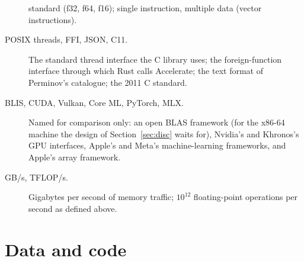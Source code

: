 \documentclass[11pt]{article}
\begin{document}
\begin{description}
  standard (f32, f64, f16); single instruction, multiple data (vector
  instructions).
\item[POSIX threads, FFI, JSON, C11.]  The standard thread interface the C
  library uses; the foreign-function interface through which Rust calls
  Accelerate; the text format of Perminov's catalogue; the 2011 C standard.
\item[BLIS, CUDA, Vulkan, Core ML, PyTorch, MLX.]  Named for comparison only:
  an open BLAS framework (for the x86-64 machine the design of
  Section~\ref{sec:disc} waits for), Nvidia's and Khronos's GPU interfaces,
  Apple's and Meta's machine-learning frameworks, and Apple's array
  framework.
\item[GB/s, TFLOP/s.]  Gigabytes per second of memory traffic; $10^{12}$
  floating-point operations per second as defined above.
\end{description}

\section{Data and code}\label{sec:data}
\end{document}
